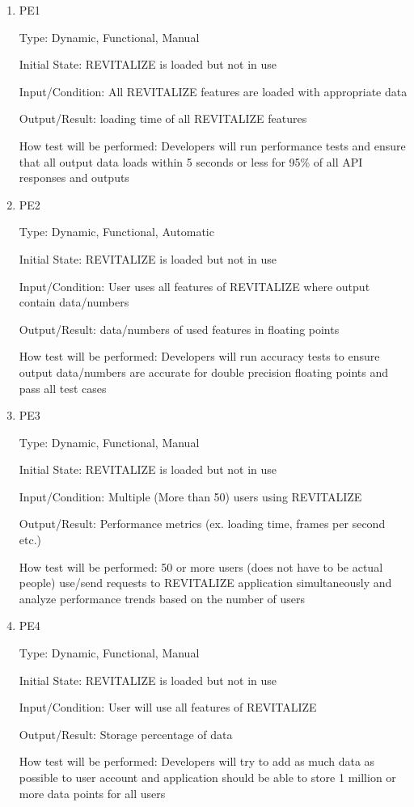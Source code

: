 \documentclass[12pt, titlepage]{article}
\begin{document}
\begin{enumerate}

\item{PE1\\}

Type: Dynamic, Functional, Manual
					
Initial State: REVITALIZE is loaded but not in use
					
Input/Condition: All REVITALIZE features are loaded with appropriate data
					
Output/Result: loading time of all REVITALIZE features
					
How test will be performed: Developers will run performance tests and ensure that all output data loads within 5 seconds or less for 95\% of all API responses and outputs
					
\item{PE2\\}

Type: Dynamic, Functional, Automatic
					
Initial State: REVITALIZE is loaded but not in use
					
Input/Condition: User uses all features of REVITALIZE where output contain data/numbers
					
Output/Result: data/numbers of used features in floating points
					
How test will be performed: Developers will run accuracy tests to ensure output data/numbers are accurate for double precision floating points and pass all test cases

\item{PE3\\}

Type: Dynamic, Functional, Manual
					
Initial State: REVITALIZE is loaded but not in use
					
Input/Condition: Multiple (More than 50) users using REVITALIZE
					
Output/Result: Performance metrics (ex. loading time, frames per second etc.)
					
How test will be performed: 50 or more users (does not have to be actual people) use/send requests to REVITALIZE application simultaneously and analyze performance trends based on the number of users

\item{PE4\\}

Type: Dynamic, Functional, Manual
					
Initial State: REVITALIZE is loaded but not in use
					
Input/Condition: User will use all features of REVITALIZE
					
Output/Result: Storage percentage of data
					
How test will be performed: Developers will try to add as much data as possible to user account and application should be able to store 1 million or more data points for all users

\end{enumerate}
\end{document}
